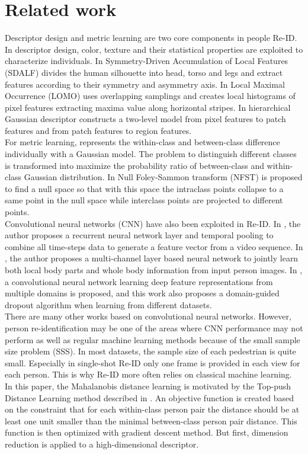 \documentclass[10pt,twocolumn,letterpaper]{article}
\begin{document}
\section{Related work}
Descriptor design and metric learning are two core components in people Re-ID. In descriptor design, color, texture and their statistical properties are exploited to characterize individuals. In \cite{SDALF} Symmetry-Driven Accumulation of Local Features (SDALF) divides the human silhouette into head, torso and legs and extract features according to their symmetry and asymmetry axis. In \cite{LOMO} Local Maximal Occurrence (LOMO) uses overlapping samplings and creates local histograms of pixel features extracting maxima value along horizontal stripes. In \cite{GOG} hierarchical Gaussian descriptor constructs a two-level model from pixel features to patch features and from patch features to region features.\\
\indent For metric learning,  \cite{LOMO} represents the within-class and between-class difference individually with a Gaussian model. The problem to distinguish different classes is transformed into maximize the probability ratio of between-class and within-class Gaussian distribution. In \cite{NFST} Null Foley-Sammon transform (NFST) is proposed to find a null space so that with this space the intraclass points collapse to a same point in the null space while interclass points are projected to different points.\\
\indent Convolutional neural networks (CNN) have also been exploited in Re-ID. In \cite{RecurrentCNN}, the author proposes a recurrent neural network layer and temporal pooling to combine all time-steps data to generate a feature vector from a video sequence. In \cite{MultiCNN}, the author proposes a multi-channel layer based neural network to jointly learn both local body parts and whole body information from input person images.  In \cite{DeepfeatureCNN}, a convolutional neural network learning deep feature representations from multiple domains is proposed, and this work also proposes a domain-guided dropout algorithm when learning from different datasets. \\
\indent There are many other works based on convolutional neural networks. However, person re-identification may be one of the areas where CNN performance may not perform as well as regular machine learning methods because of the small sample size problem (SSS). In most datasets, the sample size of each pedestrian is quite small. Especially in single-shot Re-ID only one frame is provided in each view for each person. This is why Re-ID more often relies on classical machine learning.\\
\indent In this paper, the Mahalanobis distance learning is motivated by the Top-push Distance Learning method described in \cite{TDL}. An objective function is created based on the constraint that for each within-class person pair the distance should be at least one unit smaller than the minimal between-class person pair distance. This function is then optimized with gradient descent method. But first, dimension reduction is applied to a high-dimensional descriptor.
\end{document}
